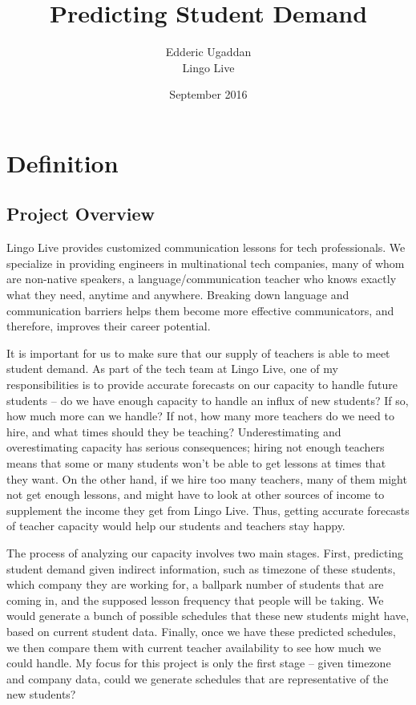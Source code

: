 \documentclass[oneside]{article}
\begin{document}
\title{Predicting Student Demand}
\author{        Edderic Ugaddan \\
                Lingo Live
}
\date{September 2016}



\maketitle
\tableofcontents
\newpage


\section{Definition}

\subsection{Project Overview}
Lingo Live provides customized communication lessons for tech professionals.
We specialize in providing engineers in multinational tech companies, many of
whom are non-native speakers, a language/communication teacher who knows
exactly what they need, anytime and anywhere. Breaking down language and
communication barriers helps them become more effective communicators, and
therefore, improves their career potential.

It is important for us to make sure that our supply of teachers is able to meet
student demand. As part of the tech team at Lingo Live, one of my
responsibilities is to provide accurate forecasts on our capacity to handle
future students -- do we have enough capacity to handle an influx of new
students? If so, how much more can we handle? If not, how many more teachers do
we need to hire, and what times should they be teaching? Underestimating and
overestimating capacity has serious consequences; hiring not enough teachers
means that some or many students won't be able to get lessons at times that
they want. On the other hand, if we hire too many teachers, many of them might
not get enough lessons, and might have to look at other sources of income to
supplement the income they get from Lingo Live. Thus, getting accurate
forecasts of teacher capacity would help our students and teachers stay happy.

The process of analyzing our capacity involves two main stages. First,
predicting student demand given indirect information, such as timezone of these
students, which company they are working for, a ballpark number of students
that are coming in, and the supposed lesson frequency that people will be
taking.  We would generate a bunch of possible schedules that these new
students might have, based on current student data. Finally, once we have these
predicted schedules, we then compare them with current teacher availability to
see how much we could handle. My focus for this project is only the first stage
-- given timezone and company data, could we generate schedules that are
representative of the new students?
\end{document}

